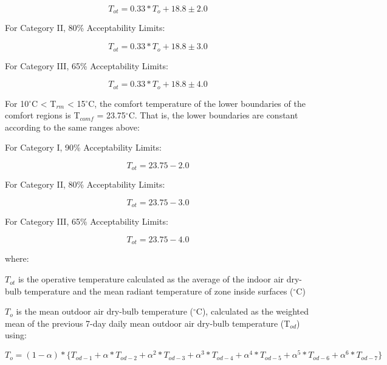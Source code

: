 \begin{equation}
T_{ot} = 0.33*T_o + 18.8 \pm 2.0
\end{equation}

For Category II, 80\% Acceptability Limits:

\begin{equation}
T_{ot} = 0.33*T_o + 18.8 \pm 3.0
\end{equation}

For Category III, 65\% Acceptability Limits:

\begin{equation}
T_{ot} = 0.33*T_o + 18.8 \pm 4.0
\end{equation}

For 10\(^{\circ}\)C \textless{} T\(_{rm}\) \textless{} 15\(^{\circ}\)C, the comfort temperature of the lower boundaries of the comfort regions is T\(_{comf}\) = 23.75\(^{\circ}\)C. That is, the lower boundaries are constant according to the same ranges above:

For Category I, 90\% Acceptability Limits:

\begin{equation}
T_{ot} = 23.75 - 2.0
\end{equation}

For Category II, 80\% Acceptability Limits:

\begin{equation}
T_{ot} = 23.75 - 3.0
\end{equation}

For Category III, 65\% Acceptability Limits:

\begin{equation}
T_{ot} = 23.75 - 4.0
\end{equation}

where:

\({T_{ot}}\) is the operative temperature calculated as the average of the indoor air dry-bulb temperature and the mean radiant temperature of zone inside surfaces (\(^{\circ}\)C)

\(T_o\) is the mean outdoor air dry-bulb temperature (\(^{\circ}\)C), calculated as the weighted mean of the previous 7-day daily mean outdoor air dry-bulb temperature (T\(_{od}\)) using:

\begin{equation}
T_{o} = (1 - \alpha) * \{T_{od-1} + \alpha * T_{od-2} + \alpha^{2} * T_{od-3} + \alpha^{3} * T_{od-4} + \alpha^{4} * T_{od-5} + \alpha^{5} * T_{od-6} + \alpha^{6} * T_{od-7}\}
\end{equation}

